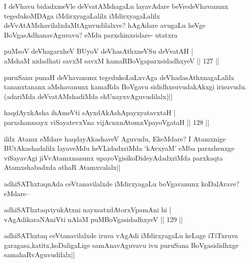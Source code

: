 \begin{artha}
I deVhavu bidadxmeVle deVvatAMshagaLu layavAdare beVredeVhavanunx tegedukoMDAga iMdirxyagaLalilx iMdirxyagaLalilx deVvAtAMshavilalxdaMtAguvudilalxve? hAgAdare avugaLu heVge BoVgasAdhanavAguvavu? eMdu parxshinxsidare- utatxra 
\end{artha}

\begin{shl}
puMsoV deVhagarxheV BUyoV deVhasAthxneVSu deVvatAH |\\
aMshaM nidadhati savxM savxM kamaRBoVgaparxsidadhxyeV \hfill || 127 ||
\end{shl}

\begin{artha}
puruSanu punaH deVhavanunx tegedukoLuLxvAga deVhadasAthxnagaLalilx tananxtananx aMshavanunx kamaRda BoVgavu sididhxsuvudakAkxgi irisuvudu.(adariMda deVvatAMshadiMda shUnayxvAguvudilalx)||
\end{artha}


\begin{shl}
haqdAyxkAsha ihA\s \s meVti sAyxdAkAshApayxyatavxtaH |\\
parxshanxsayx viSayatevxVna vijAcnxnAtomxVpayoVgataH \hfill || 128 ||
\end{shl}

\begin{artha}
ililx Atamx eMdare haqdayAkashaveV Aguvudu, EkeMdare? I Atamxnige BUtAkashadalilx layaveMdu heVLidadxriMda `kAvxyaM' eMba parxshenxge viSayavAgi jiVvAtamxnanunx upayoVgisikoDideyAdadxriMda parxkaqta Atamxshabadxda athaR Atamxvalalx||
\end{artha}

\begin{artha}
adhiSAThxtaqnAda ceVtanavilalxde iMdirxyagaLu boVgavanunx koDalArave? eMdare--
\end{artha}

\begin{shl}
adhiSAThxtaqviyukAtxni nayxsatxdAtorxVpamAni hi |\\
vAgAdikaraNAniVti nAlaM puMBoVgasidadhxyeV \hfill || 129 ||
\end{shl}

\begin{artha}
adhiSAThxtaq ceVtanavilalxde iruva vAgAdi iMdirxyagaLu keLage iTiTxruva garagasa,katitx,koDaligaLige samAnavAguvavu  ivu puruSana BoVgasididhxge samahaRvAguvudilalx||
\end{artha}

